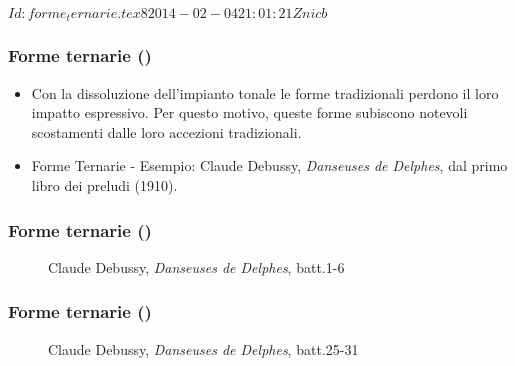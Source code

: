 %
%
\svnInfo $Id: forme_ternarie.tex 8 2014-02-04 21:01:21Z nicb $

\setcounter{ms}{0}
\begin{frame}
    \frametitle{Forme ternarie ()}

    \begin{itemize}

        \item Con la dissoluzione dell'impianto tonale
              le forme tradizionali perdono il loro impatto espressivo.
              Per questo motivo, queste forme subiscono notevoli scostamenti
              dalle loro accezioni tradizionali.

        \item Forme Ternarie - Esempio:
              Claude Debussy, \emph{Danseuses de Delphes},
              dal primo libro dei preludi (1910).

    \end{itemize}

\end{frame}

\begin{frame}
    \frametitle{Forme ternarie ()}

    \begin{center}
	    \begin{figure}
	        \caption{Claude Debussy, \emph{Danseuses de Delphes}, batt.1-6}
	    \end{figure}
    \end{center}

\end{frame}

\begin{frame}
    \frametitle{Forme ternarie ()}

    \begin{center}
	    \begin{figure}
        \caption{Claude Debussy, \emph{Danseuses de Delphes}, batt.25-31}
      \end{figure}
    \end{center}

\end{frame}

